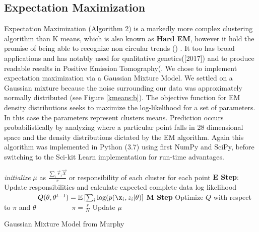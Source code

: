 \documentclass{article}
\begin{document}
\subsection{Expectation Maximization}
Expectation Maximization (Algorithm 2)  is a markedly more complex clustering algorithm than K means, which is also known as \textbf{Hard EM}, however it hold the promise of being able to recognize non circular trends (\cite{murphy}) . It too has broad applications and has notably used for qualitative genetics(\cite{gosh}[2017]) and to produce readable results in Positive Emission Tomography(\cite{diffey}. We chose to implement  expectation maximization via a Gaussian Mixture Model. We settled on a Gaussian mixture because the noise surrounding our data was approximately normally distributed (see Figure \ref{kmeans:b}). The objective function for EM density distributions seeks to maximize the log-likelihood for a set of parameters. In this case the parameters represent clusters means. Prediction occurs probabilistically by analyzing where a particular point falls in 28 dimensional space and the density distributions dictated by the EM algorithm. Again this algorithm was implemented in Python (3.7) using first NumPy and SciPy, before switching to the Sci-kit Learn implementation for run-time advantages. 
\begin{center}
\begin{algorithm}
 \textit{initialize} $\mu$ as $\frac{\sum_i \vec{r}_i \vec{X}}{r}$ or responsibility of each cluster for each point \;
   {\textbf{E Step}: Update responsibilities and calculate expected complete data log likelihood\;
   $\phantom{hashashas} Q(\theta, \theta^{t-1}) = \mathbb{E} \left[ \sum_i \log(p (\x_i,z_i|\theta)\right]$\;
   \textbf{M Step} Optimize $Q$ with respect to $\pi$ and $\theta$\;
    $\phantom{hashashas} \pi = \frac{r}{N}$\;
    Update $\mu$
   }
 \caption{Gaussian Mixture Model from Murphy}
\end{algorithm}
\end{center}
\end{document}
